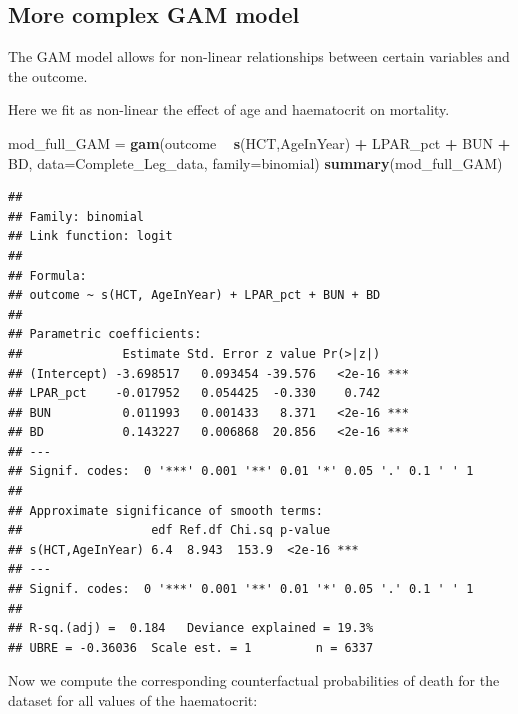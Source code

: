 \documentclass[]{article}
\newenvironment{Shaded}{\begin{snugshade}}{\end{snugshade}}
\newcommand{\KeywordTok}[1]{\textcolor[rgb]{0.13,0.29,0.53}{\textbf{#1}}}
\newcommand{\DataTypeTok}[1]{\textcolor[rgb]{0.13,0.29,0.53}{#1}}
\newcommand{\StringTok}[1]{\textcolor[rgb]{0.31,0.60,0.02}{#1}}
\newcommand{\OperatorTok}[1]{\textcolor[rgb]{0.81,0.36,0.00}{\textbf{#1}}}
\newcommand{\NormalTok}[1]{#1}
\begin{document}
\subsection{More complex GAM model}\label{more-complex-gam-model}

The GAM model allows for non-linear relationships between certain
variables and the outcome.

Here we fit as non-linear the effect of age and haematocrit on
mortality.

\begin{Shaded}
\begin{Highlighting}[]
\NormalTok{mod_full_GAM =}\StringTok{ }\KeywordTok{gam}\NormalTok{(outcome }\OperatorTok{~}\StringTok{ }\KeywordTok{s}\NormalTok{(HCT,AgeInYear) }\OperatorTok{+}\StringTok{ }\NormalTok{LPAR_pct }\OperatorTok{+}\StringTok{ }\NormalTok{BUN }\OperatorTok{+}\StringTok{ }\NormalTok{BD,}
               \DataTypeTok{data=}\NormalTok{Complete_Leg_data, }\DataTypeTok{family=}\NormalTok{binomial)}
\KeywordTok{summary}\NormalTok{(mod_full_GAM)}
\end{Highlighting}
\end{Shaded}

\begin{verbatim}
## 
## Family: binomial 
## Link function: logit 
## 
## Formula:
## outcome ~ s(HCT, AgeInYear) + LPAR_pct + BUN + BD
## 
## Parametric coefficients:
##              Estimate Std. Error z value Pr(>|z|)    
## (Intercept) -3.698517   0.093454 -39.576   <2e-16 ***
## LPAR_pct    -0.017952   0.054425  -0.330    0.742    
## BUN          0.011993   0.001433   8.371   <2e-16 ***
## BD           0.143227   0.006868  20.856   <2e-16 ***
## ---
## Signif. codes:  0 '***' 0.001 '**' 0.01 '*' 0.05 '.' 0.1 ' ' 1
## 
## Approximate significance of smooth terms:
##                  edf Ref.df Chi.sq p-value    
## s(HCT,AgeInYear) 6.4  8.943  153.9  <2e-16 ***
## ---
## Signif. codes:  0 '***' 0.001 '**' 0.01 '*' 0.05 '.' 0.1 ' ' 1
## 
## R-sq.(adj) =  0.184   Deviance explained = 19.3%
## UBRE = -0.36036  Scale est. = 1         n = 6337
\end{verbatim}

Now we compute the corresponding counterfactual probabilities of death
for the dataset for all values of the haematocrit:
\end{document}
